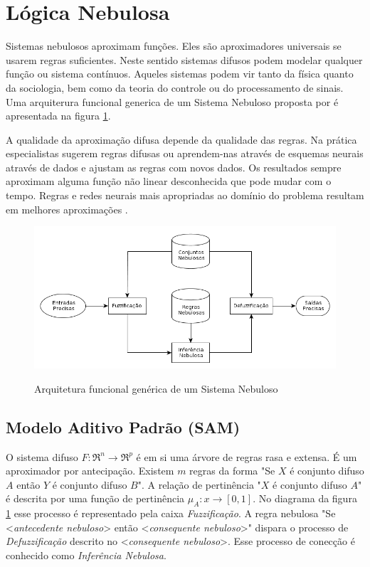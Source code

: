 \section{Lógica Nebulosa}

Sistemas nebulosos aproximam funções. Eles são aproximadores universais se usarem regras suficientes. 
Neste sentido sistemas difusos podem modelar qualquer função ou sistema contínuos. Aqueles sistemas 
podem vir tanto da física quanto da sociologia, bem como da teoria do controle ou do 
processamento de sinais. Uma arquiterura funcional generica de um Sistema Nebuloso proposta por
\cite{passos2005datamining} é apresentada na figura \ref{arq_fuzzy}.

A qualidade da aproximação difusa depende da qualidade das regras. Na prática especialistas sugerem regras
difusas ou aprendem-nas através de esquemas neurais através de dados e ajustam as regras com novos dados.
Os resultados sempre aproximam alguma função não linear desconhecida que pode mudar com o tempo. Regras e redes neurais mais apropriadas ao domínio do problema resultam em melhores aproximações \cite{kosko1997fuzzy}.

\begin{figure}
  \includegraphics[width=15cm]{imgs/arquitetura_fuzzy}\label{arq_fuzzy}
  \caption{Arquitetura funcional genérica de um Sistema Nebuloso \cite{passos2005datamining}}
\end{figure}

\subsection{Modelo Aditivo Padrão (SAM)}

O sistema difuso $F:\Re^n \rightarrow \Re^p$ é em si uma árvore de regras rasa e extensa. É um aproximador
por antecipação. Existem $m$ regras da forma "Se $X$ é conjunto difuso $A$ então $Y$ é conjunto difuso $B$".
A relação de pertinência "$X$ é conjunto difuso $A$" é descrita por uma função de pertinência
$\mu_A: x \longrightarrow [0,1]$. No diagrama da figura \ref{arq_fuzzy} esse processo é representado pela
caixa \emph{Fuzzificação}. A regra nebulosa "Se <\textit{antecedente nebuloso}> então <\textit{consequente nebuloso}>" dispara
o processo de \emph{Defuzzificação} descrito no <\textit{consequente nebuloso}>. Esse processo de conecção é conhecido como
\emph{Inferência Nebulosa}.

